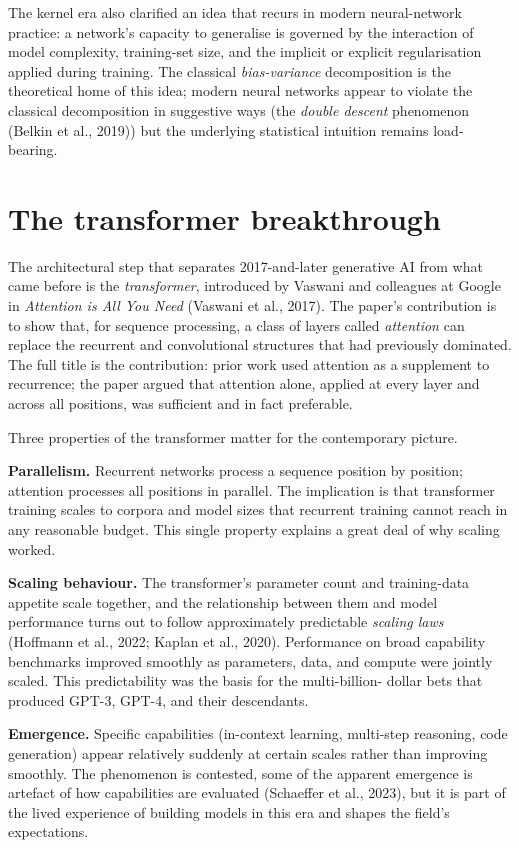 \documentclass[
  letterpaper,
  11pt]{scrbook}
\begin{document}
The kernel era also clarified an idea that recurs in modern
neural-network practice: a network's capacity to generalise is governed
by the interaction of model complexity, training-set size, and the
implicit or explicit regularisation applied during training. The
classical \emph{bias-variance} decomposition is the theoretical home of
this idea; modern neural networks appear to violate the classical
decomposition in suggestive ways (the \emph{double descent} phenomenon
(Belkin et al., 2019)) but the underlying statistical intuition remains
load-bearing.

\section{The transformer
breakthrough}\label{the-transformer-breakthrough}

The architectural step that separates 2017-and-later generative AI from
what came before is the \emph{transformer}, introduced by Vaswani and
colleagues at Google in \emph{Attention is All You Need} (Vaswani et
al., 2017). The paper's contribution is to show that, for sequence
processing, a class of layers called \emph{attention} can replace the
recurrent and convolutional structures that had previously dominated.
The full title is the contribution: prior work used attention as a
supplement to recurrence; the paper argued that attention alone, applied
at every layer and across all positions, was sufficient and in fact
preferable.

Three properties of the transformer matter for the contemporary picture.

\textbf{Parallelism.} Recurrent networks process a sequence position by
position; attention processes all positions in parallel. The implication
is that transformer training scales to corpora and model sizes that
recurrent training cannot reach in any reasonable budget. This single
property explains a great deal of why scaling worked.

\textbf{Scaling behaviour.} The transformer's parameter count and
training-data appetite scale together, and the relationship between them
and model performance turns out to follow approximately predictable
\emph{scaling laws} ({Hoffmann et al.}, 2022; Kaplan et al., 2020).
Performance on broad capability benchmarks improved smoothly as
parameters, data, and compute were jointly scaled. This predictability
was the basis for the multi-billion- dollar bets that produced GPT-3,
GPT-4, and their descendants.

\textbf{Emergence.} Specific capabilities (in-context learning,
multi-step reasoning, code generation) appear relatively suddenly at
certain scales rather than improving smoothly. The phenomenon is
contested, some of the apparent emergence is artefact of how
capabilities are evaluated (Schaeffer et al., 2023), but it is part of
the lived experience of building models in this era and shapes the
field's expectations.
\end{document}
